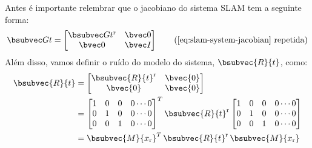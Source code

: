 Antes é importante relembrar que o jacobiano do sistema SLAM tem a seguinte 
forma:
\begin{equation*}
  \slamsystemjacobian \tag{\ref{eq:slam-system-jacobian} repetida}
\end{equation*}
Além disso, vamos definir o ruído do modelo do sistema, $\bsubvec{R}{t}$, como:
\begin{equation}
\begin{aligned}
\bsubvec{R}{t} &= \begin{bmatrix}
  \bsubvec{R}{t}^{\mathrm{r}} & \bvec{0} \\
  \bvec{0} & \bvec{0} \\
  \end{bmatrix}\\
  &= \begin{bmatrix}
    1 & 0 & 0 & 0 \cdots 0 \\
    0 & 1 & 0 & 0 \cdots 0 \\
    0 & 0 & 1 & 0 \cdots 0
  \end{bmatrix}^T \bsubvec{R}{t}^{\mathrm{r}}
  \begin{bmatrix}
    1 & 0 & 0 & 0 \cdots 0 \\
    0 & 1 & 0 & 0 \cdots 0 \\
    0 & 0 & 1 & 0 \cdots 0
  \end{bmatrix} \\
  &= \bsubvec{M}{x_\mathrm{r}}^T \, \bsubvec{R}{t}^{\mathrm{r}} \, \bsubvec{M}{x_\mathrm{r}}
\end{aligned}
\label{eq:slam-system-error}
\end{equation}

